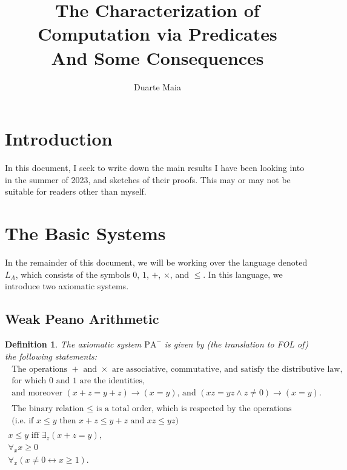 \documentclass{article}
\title{The Characterization of Computation via Predicates\\
And Some Consequences}
\author{Duarte Maia}
\newtheorem{definition}[theorem]{Definition}
\theoremstyle{nonumberplain}
\newcommand{\LA}{L_A}
\newcommand{\PA}{\mathrm{PA}}
\newcommand{\WPA}{\PA^-}
\begin{document}
\maketitle

\tableofcontents

\section{Introduction}

In this document, I seek to write down the main results I have been looking into in the summer of 2023, and sketches of their proofs. This may or may not be suitable for readers other than myself.

\section{The Basic Systems}

In the remainder of this document, we will be working over the language denoted $\LA$, which consists of the symbols $0$, $1$, $+$, $\times$, and $\leq$. In this language, we introduce two axiomatic systems.

\subsection{Weak Peano Arithmetic}

\begin{definition}
The axiomatic system $\WPA$ is given by (the translation to FOL of) the following statements:
\begin{gather}
\begin{gathered}
\text{The operations $+$ and $\times$ are associative, commutative, and satisfy the distributive law,}\\
\text{for which $0$ and $1$ are the identities,}\\
\text{and moreover $(x+z = y+z) \rightarrow (x=y)$, and $(xz = yz \land z \neq 0) \rightarrow (x=y)$.}
\end{gathered} \tag{SRing}\label{ax:sring} \\
\begin{gathered}
\text{The binary relation $\leq$ is a total order, which is respected by the operations}\\
\text{(i.e. if $x \leq y$ then $x+z \leq y+z$ and $xz \leq yz$)}
\end{gathered} \tag{Ord}\label{ax:ord}\\
\text{$x \leq y$ iff $\exists_z (x+z = y)$,} \tag{Def$\leq$}\label{ax:defleq}\\
\forall_x x \geq 0 \tag{ZMin}\label{ax:zmin}\\
\forall_x (x \neq 0 \leftrightarrow x \geq 1). \tag{Disc}\label{ax:disc}
\end{gather}
\end{definition}
\end{document}
